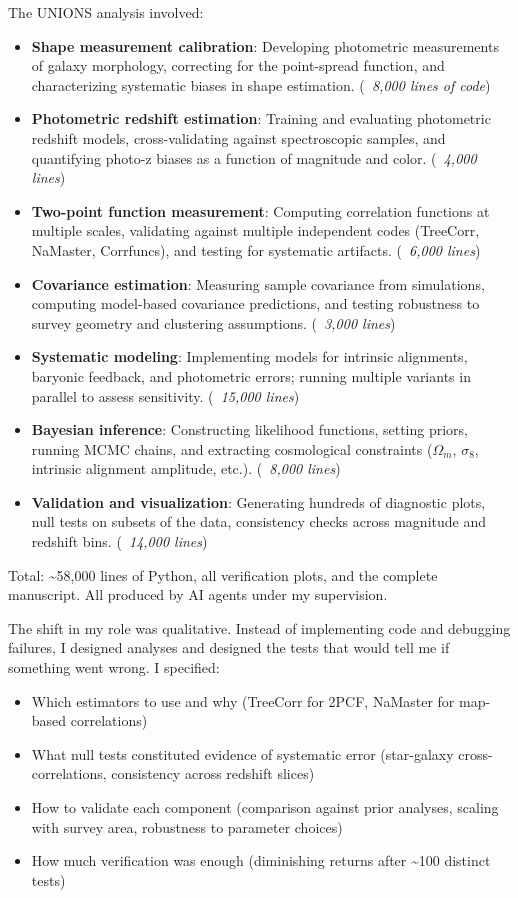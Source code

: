 \documentclass[11pt,a4paper]{article}
\begin{document}
The UNIONS analysis involved:
\begin{itemize}
\item \textbf{Shape measurement calibration}: Developing photometric measurements of galaxy morphology, correcting for the point-spread function, and characterizing systematic biases in shape estimation. (\textit{~8,000 lines of code})
\item \textbf{Photometric redshift estimation}: Training and evaluating photometric redshift models, cross-validating against spectroscopic samples, and quantifying photo-z biases as a function of magnitude and color. (\textit{~4,000 lines})
\item \textbf{Two-point function measurement}: Computing correlation functions at multiple scales, validating against multiple independent codes (TreeCorr, NaMaster, Corrfuncs), and testing for systematic artifacts. (\textit{~6,000 lines})
\item \textbf{Covariance estimation}: Measuring sample covariance from simulations, computing model-based covariance predictions, and testing robustness to survey geometry and clustering assumptions. (\textit{~3,000 lines})
\item \textbf{Systematic modeling}: Implementing models for intrinsic alignments, baryonic feedback, and photometric errors; running multiple variants in parallel to assess sensitivity. (\textit{~15,000 lines})
\item \textbf{Bayesian inference}: Constructing likelihood functions, setting priors, running MCMC chains, and extracting cosmological constraints ($\Omega_m$, $\sigma_8$, intrinsic alignment amplitude, etc.). (\textit{~8,000 lines})
\item \textbf{Validation and visualization}: Generating hundreds of diagnostic plots, null tests on subsets of the data, consistency checks across magnitude and redshift bins. (\textit{~14,000 lines})
\end{itemize}

Total: \textasciitilde58,000 lines of Python, all verification plots, and the complete manuscript. All produced by AI agents under my supervision.

The shift in my role was qualitative. Instead of implementing code and debugging failures, I designed analyses and designed the tests that would tell me if something went wrong. I specified:
\begin{itemize}
\item Which estimators to use and why (TreeCorr for 2PCF, NaMaster for map-based correlations)
\item What null tests constituted evidence of systematic error (star-galaxy cross-correlations, consistency across redshift slices)
\item How to validate each component (comparison against prior analyses, scaling with survey area, robustness to parameter choices)
\item How much verification was enough (diminishing returns after \textasciitilde100 distinct tests)
\end{itemize}
\end{document}
